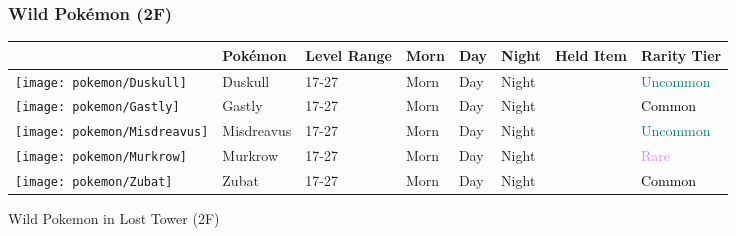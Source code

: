 \subsubsection{Wild Pokémon (2F)}%
\label{ssubsec:WildPokmon(2F)}%
\begin{longtable}{||l l l l l l l l||}%
\hline%
&Pokémon&Level Range&Morn&Day&Night&Held Item&Rarity Tier\\%
\hline%
\endhead%
\hline%
\texttt{[image: pokemon/Duskull]}&Duskull&17{-}27&Morn&Day&Night&&\textcolor{teal}{%
Uncommon%
}\\%
\hline%
\texttt{[image: pokemon/Gastly]}&Gastly&17{-}27&Morn&Day&Night&&\textcolor{black}{%
Common%
}\\%
\hline%
\texttt{[image: pokemon/Misdreavus]}&Misdreavus&17{-}27&Morn&Day&Night&&\textcolor{teal}{%
Uncommon%
}\\%
\hline%
\texttt{[image: pokemon/Murkrow]}&Murkrow&17{-}27&Morn&Day&Night&&\textcolor{violet}{%
Rare%
}\\%
\hline%
\texttt{[image: pokemon/Zubat]}&Zubat&17{-}27&Morn&Day&Night&&\textcolor{black}{%
Common%
}\\%
\hline%
\end{longtable}%
\caption{Wild Pokemon in Lost Tower (2F)}